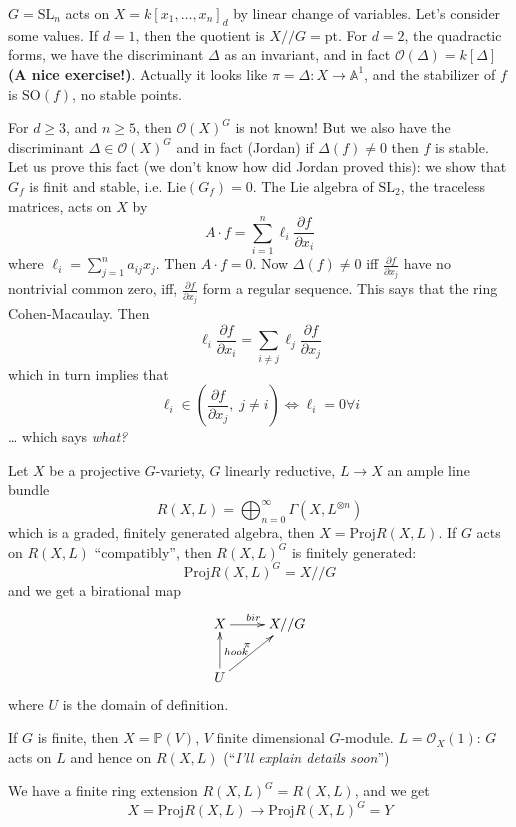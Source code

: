 \begin{example}
\label{example-action-of-SL2-on-forms}
$G=\text{SL}_n$ acts on $X=k[x_1,\ldots,x_n]_d$ by linear change of variables.
Let's consider some values. If $d=1$, then the quotient is  $X//G=\text{pt}$.
For $d=2$, the quadractic forms, we have the discriminant $\Delta$ as an 
invariant, and in fact $\mathcal{O}(\Delta)=k[\Delta]$ {\bf (A nice exercise!)}. 
Actually it looks like $\pi=\Delta:X \to \mathbb{A}^1$, and the stabilizer of 
$f$ is $\text{SO}(f)$, no stable points.

For $d \geq 3$, and $n \geq 5$, then $\mathcal{O}(X)^G$ is not known! But we
also have the discriminant $\Delta \in \mathcal{O}(X)^G$ and in fact (Jordan) if
$\Delta(f) \neq 0$ then $f$ is stable. Let us prove this fact (we don't know how
did Jordan proved this): we show that $G_f$ is finit and stable, i.e.
$\text{Lie}(G_f)=0$. The Lie algebra of $\text{SL}_2$, the traceless matrices,
acts on $X$ by
$$
A\cdot f= \sum_{i=1}^n \ell_i \frac{\partial f}{\partial x_i}
$$
where $\ell_i = \sum_{j=1}^n a_{ij}x_j$. Then $A\cdot f=0$. Now 
$\Delta(f) \neq 0$ iff $\frac{\partial f}{\partial x_j}$ have no nontrivial
common zero, iff, $\frac{\partial f}{\partial x_j}$ form a regular sequence.
This says that the ring Cohen-Macaulay. Then
$$
\ell_i \frac{\partial f}{\partial x_i}
=\sum_{i \neq  j}\ell_j \frac{\partial f}{\partial x_j}
$$
which in turn implies that
$$
\ell_i \in \left(\frac{\partial f}{\partial x_j}, \; j \neq  i\right)
\iff \ell_i=0 \forall  i
$$
… which says {\it what?}
\end{example}

\medskip\noindent
Let $X$ be a projective $G$-variety, $G$ linearly reductive, $L \to X$ an ample
line bundle
$$
R(X,L)=\bigoplus_{n=0}^{\infty} \Gamma(X,L^{\otimes n})
$$
which is a graded, finitely generated algebra, then $X=\text{Proj}R(X,L)$. If
$G$ acts on $R(X,L)$ ``compatibly'', then $R(X,L)^G$ is finitely generated:
$$
\text{Proj}R(X,L)^G=X//G
$$
and we get a birational map
$$
\xymatrix{
X\ar[r]^{bir}& X//G\\
U\ar[u]_{hook}\ar[ur]^{\pi}
}
$$
where $U$ is the domain of definition.

If $G$ is finite, then  $X= \mathbb{P}(V)$, $V$ finite dimensional $G$-module. 
$L = \mathcal{O}_X(1)$: $G$ acts on $L$ and hence on $R(X,L)$ (``{\it I'll explain
details soon}'')

We have a finite ring extension $R(X,L)^G = R(X,L)$, and we get
$$
X=\text{Proj}R(X,L) \to \text{Proj}R(X,L)^G=Y
$$

